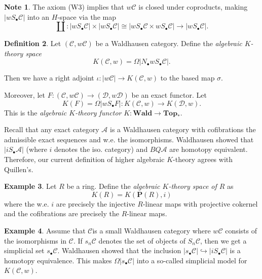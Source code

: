 \documentclass[10pt,letterpaper,cm]{nupset}
\theoremstyle{definition}
\newtheorem{definition}{Definition}
\newtheorem{exmp}[definition]{Example}
\newtheorem{note}[definition]{Note}
\theoremstyle{theorem}
\theoremstyle{remark}
\renewcommand{\P}{\mathbf P}
\newcommand{\1}{\mathbf{1}}
\renewcommand{\a}{\mathscr{A}}
\renewcommand{\c}{\mathscr{C}}
\renewcommand{\d}{\mathscr{D}}
\newcommand{\0}{\vec 0}
\begin{document}
\begin{note}
The axiom (W3) implies that $w{\c}$ is closed under coproducts, making $\lvert{wS_{\bullet} \c}\rvert$ into an $H$-space via the map $$\coprod: \lvert{wS_{\bullet} \c}\rvert \times \lvert{wS_{\bullet} \c}\rvert \cong \lvert{wS_{\bullet} \c \times  wS_{\bullet} \c}\rvert\to \lvert{wS_{\bullet} \c}\rvert.$$
\end{note}

\begin{definition}
Let $\left(\c, w{\c}\right)$ be a Waldhausen category. Define the \textit{algebraic $K$-theory space} $$K(\c, w) = \Omega \lvert{ N_{\bullet} wS_{\bullet} \c}\rvert.$$ 
\end{definition}

Then we have a right adjoint $\iota: \lvert{w{\c}}\rvert \to K(\c, w)$ to the based map $\sigma$.

\medskip

 Moreover,
let $F : \left(\c, w{\c}\right) \to \left(\d, w{\d}\right)$ be an exact functor. Let $$K(F) = \Omega\lvert{wS_{\bullet}F}\rvert : K(\c, w) \to K(\d, w).$$ This is the \textit{algebraic $K$-theory functor} $K : \mathbf{Wald} \to \mathbf{Top_{\ast}}.$

\medskip

Recall that any exact category $\a$ is a Waldhausen category with cofibrations the admissible exact sequences and w.e. the isomorphisms. Waldhausen showed that $\lvert{iS_{\bullet}\a}\rvert$ (where $i$ denotes the iso. category) and $BQ\a$ are homotopy equivalent. Therefore, our current definition of higher algebraic $K$-theory agrees with Quillen's.


\begin{exmp}
Let $R$ be a ring. Define the \textit{algebraic $K$-theory space of $R$} as $$K(R) = K(\P(R), i)$$ where the w.e. $i$ are precisely the injective $R$-linear maps with projective cokernel and the cofibrations are precisely the $R$-linear maps.
\end{exmp}

\begin{exmp}
Assume that $\c$is a small Waldhausen category where $w{\c}$ consists of the isomorphisms in $\c$. If $s_n\c$ denotes the set of objects of $S_n \c$, then we get a simplicial set $s_{\bullet} \c$. Waldhausen showed that the inclusion $\lvert{s_{\bullet} \c}\rvert \hookrightarrow \lvert{iS_{\bullet} \c}\rvert$ is a homotopy equivalence. This makes $\Omega |s_{\bullet} \c|$ into a so-called simplicial model for $K(\c, w)$.
\end{exmp}
\end{document}

